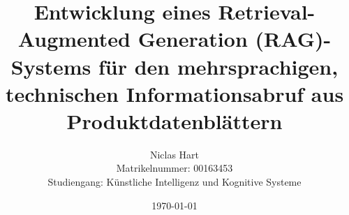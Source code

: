 \titlehead{
    \centering Hochschule für Angewandte Wissenschaften Ansbach\\
    \vspace{1cm}
    \texttt{[image: images/Logo\_Hochschule\_Ansbach]}}
\subject{Bachelorthesis}
\title{Entwicklung eines Retrieval-Augmented Generation (RAG)-Systems für den mehrsprachigen, technischen Informationsabruf aus Produktdatenblättern}
\author{Niclas Hart\\Matrikelnummer: 00163453\\Studiengang: Künstliche Intelligenz und Kognitive Systeme}
\date{\today}
\publishers{Betreuer: Prof. Dr. Sigurd Schacht}
\maketitle